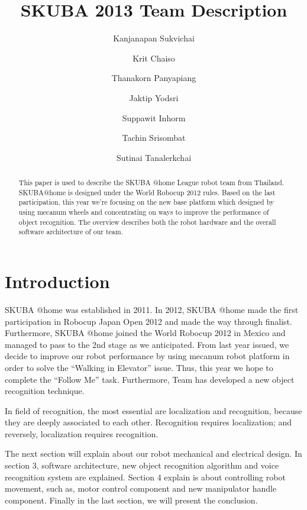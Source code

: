 \documentclass{llncs}
\newcommand{\dq}[1]{``#1''}
\begin{document}
\title{SKUBA 2013 Team Description}
\author{Kanjanapan Sukvichai
\and Krit Chaiso
\and Thanakorn Panyapiang
\and Jaktip Yodsri
\and Suppawit Inhorm
\and Tachin Srisombat
\and Sutinai Tanalerkchai
}


\maketitle

\begin{abstract}
This paper is used to describe the SKUBA @home League robot team from Thailand.
SKUBA@home is designed under the World Robocup 2012 rules. 
Based on the last participation, this year we're focusing on the new base platform which designed by using mecanum wheels and concentrating on ways to improve the performance of object recognition.
The overview describes both the robot hardware and the overall software architecture of our team.
\end{abstract}

\section{Introduction}
SKUBA @home was established in 2011. In 2012, SKUBA @home made the first participation in Robocup Japan Open 2012 and made the way through finalist. Furthermore, SKUBA @home joined the World Robocup 2012 in Mexico and managed to pass to the 2nd stage as we anticipated. From last year issued, we decide to improve our robot performance by using mecanum robot platform in order to solve the \dq{Walking in Elevator} issue. Thus, this year we hope to complete the \dq{Follow Me} task. Furthermore, Team has developed a new object recognition technique.

In field of recognition, the most essential are localization and recognition, because they are deeply associated to each other. Recognition requires localization; and reversely, localization requires recognition.

The next section will explain about our robot mechanical and electrical design. In section 3, software architecture, new object recognition algorithm and voice recognition system are explained. Section 4 explain is about controlling robot movement, such as, motor control component and new manipulator handle component. Finally in the last section, we will present the conclusion.
\end{document}
